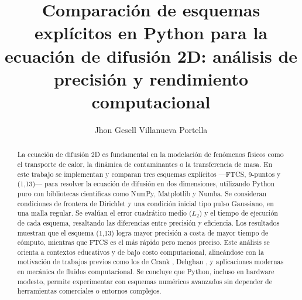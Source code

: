 \documentclass[preprint]{elsarticle}
\begin{document}
\begin{frontmatter}

\title{Comparación de esquemas explícitos en Python para la ecuación de difusión 2D: análisis de precisión y rendimiento computacional}

\author{Jhon Gesell Villanueva Portella}

\begin{abstract}
La ecuación de difusión 2D es fundamental en la modelación de fenómenos físicos como el transporte de calor, la dinámica de contaminantes o la transferencia de masa. En este trabajo se implementan y comparan tres esquemas explícitos —FTCS, 9-puntos y (1,13)— para resolver la ecuación de difusión en dos dimensiones, utilizando Python puro con bibliotecas científicas como NumPy, Matplotlib y Numba. Se consideran condiciones de frontera de Dirichlet y una condición inicial tipo pulso Gaussiano, en una malla regular. Se evalúan el error cuadrático medio (\(L_2\)) y el tiempo de ejecución de cada esquema, resaltando las diferencias entre precisión y eficiencia. Los resultados muestran que el esquema (1,13) logra mayor precisión a costa de mayor tiempo de cómputo, mientras que FTCS es el más rápido pero menos preciso. Este análisis se orienta a contextos educativos y de bajo costo computacional, alineándose con la motivación de trabajos previos como los de Crank \cite{crank_diffusion}, Dehghan \cite{dehghan1999,dehghan2002}, y aplicaciones modernas en mecánica de fluidos computacional. Se concluye que Python, incluso en hardware modesto, permite experimentar con esquemas numéricos avanzados sin depender de herramientas comerciales o entornos complejos.

\end{abstract}

\end{frontmatter}










\end{document}
